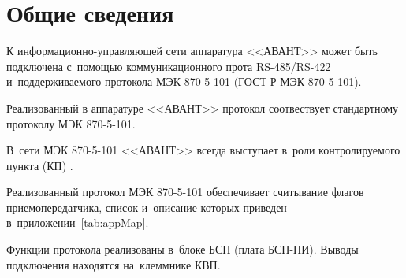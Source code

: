 \section{Общие сведения} \label{sec:overview}

К информационно-управляющей сети аппаратура <<АВАНТ>> может быть подключена с~помощью коммуникационного прота RS-485/RS-422 и~поддерживаемого протокола МЭК 870-5-101 (ГОСТ Р МЭК 870-5-101).  

Реализованный в аппаратуре <<АВАНТ>> протокол соотвествует стандартному протоколу МЭК 870-5-101.

В~сети МЭК 870-5-101 <<АВАНТ>> всегда выступает в~роли контролируемого пункта (КП) .

Реализованный протокол МЭК 870-5-101 обеспечивает считывание флагов приемопередатчика, список и~описание которых приведен в~приложении~\ref{tab:appMap}.

Функции протокола реализованы в~блоке БСП (плата БСП-ПИ). Выводы подключения находятся на~клеммнике КВП.